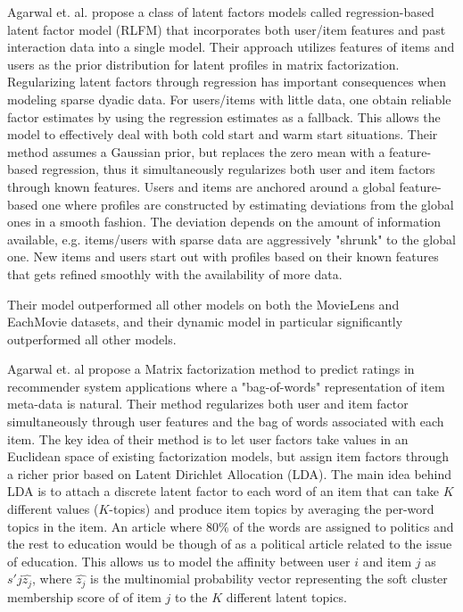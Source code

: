 Agarwal et. al. \cite{Agarwal2009} propose a class of latent factors models called regression-based latent factor model (RLFM) that incorporates both user/item features and past interaction data into a single model. Their approach utilizes features of items and users as the
prior distribution for latent profiles in matrix factorization. Regularizing latent factors through regression has important consequences when modeling sparse dyadic data. For users/items with little data, one obtain reliable factor estimates by using the regression estimates as a fallback. This allows the model to effectively deal with both cold start and warm start situations. Their method assumes a Gaussian prior, but replaces the zero mean with a feature-based regression, thus it simultaneously regularizes both user and item factors through known features. Users and items are anchored around a global feature-based one where profiles are constructed by estimating deviations from the global ones in a smooth fashion. The deviation depends on the amount of information available, e.g. items/users with sparse data are aggressively "shrunk" to the global one. New items and users start out with profiles based on their known features that gets refined smoothly with the availability of more data.

Their model outperformed all other models on both the MovieLens and EachMovie datasets, and their dynamic model in particular significantly outperformed all other models.


Agarwal et. al \cite{Agarwal2010} propose a Matrix factorization method to predict ratings in recommender system
applications where a "bag-of-words" representation of item meta-data is natural. Their method regularizes both user and item factor simultaneously through user features and the bag of words associated with each item. The key idea of their method is to let user factors take values in an Euclidean space of existing factorization models, but assign item factors through a richer prior based on Latent Dirichlet Allocation (LDA). The main idea behind LDA is to attach a discrete latent factor to each word of an item that can take $K$ different values ($K$-topics) and produce item topics by averaging the per-word topics in the item. An article where 80$\%$ of the words are assigned to politics and the rest to education would be though of as a political article related to the issue of education. This allows us to model the affinity between user $i$ and item $j$ as $s'{j}\hat{z_{j}}$, where $\hat{z_{j}}$ is the multinomial probability vector representing the soft cluster membership score of of item $j$ to the $K$ different latent topics.

